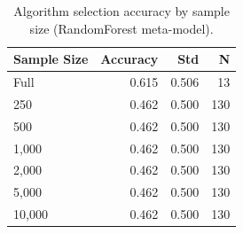 \begin{table}[t]
\centering
\caption{Algorithm selection accuracy by sample size (RandomForest meta-model).}
\label{tab:rq3}
\begin{tabular}{lrrr}
\toprule
Sample Size & Accuracy & Std & N \\
\midrule
Full & 0.615 & 0.506 & 13 \\
250 & 0.462 & 0.500 & 130 \\
500 & 0.462 & 0.500 & 130 \\
1,000 & 0.462 & 0.500 & 130 \\
2,000 & 0.462 & 0.500 & 130 \\
5,000 & 0.462 & 0.500 & 130 \\
10,000 & 0.462 & 0.500 & 130 \\
\bottomrule
\end{tabular}
\end{table}